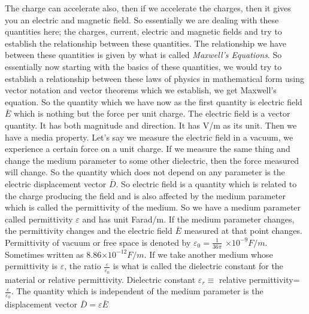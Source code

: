 \begin{mdframed}[ backgroundcolor=lightblue, linewidth=1pt, hidealllines=true]
The charge can accelerate also, then if we accelerate the charges, then it gives you an electric and magnetic field. So essentially we are dealing with these quantities here; the charges, current, electric and magnetic fields and try to establish the relationship between these quantities. The relationship we have between these quantities is given by what is called \emph{Maxwell's Equations}. So essentially now starting with the basics of these quantities, we would try to establish a relationship between these laws of physics in mathematical form using vector notation and vector theorems which we establish, we get Maxwell's equation. So the quantity which we have now as the first quantity is electric field $\bar{E}$ which is nothing but the force per unit charge. The electric field is a vector quantity. It has both magnitude and direction. It has V/m as its unit. Then we have a media property. Let's say we measure the electric field in a vacuum, we experience a certain force on a unit charge. If we measure the same thing and change the medium parameter to some other dielectric, then the force measured will change. So the quantity which does not depend on any parameter is the electric displacement vector $\bar{D}$.
So electric field is a quantity which is related to the charge producing the field and is also affected by the medium parameter which is called the permittivity of the medium. So we have a medium parameter called permittivity $\varepsilon$ and has unit Farad/m. If the medium parameter changes, the permittivity changes and the electric field $\bar{E}$ measured at that point changes. Permittivity of vacuum or free space is denoted by $\varepsilon_{0} =\frac{1}{36\pi}$ $\times 10^{-9}F/m$. Sometimes written as 8.86$\times10^{-12}F/m.$
If we take another medium whose permittivity is $\varepsilon$, the ratio $\frac{\varepsilon}{\varepsilon_{0}}$ is what is called the dielectric constant for the material or relative permittivity. 
Dielectric constant $\varepsilon_{r}\equiv$ relative permittivity= $\frac{\varepsilon}{\varepsilon_{0}}$.
The quantity which is independent of the medium parameter is the displacement vector $\bar{D}=\varepsilon \bar{E}$


\end{mdframed}
